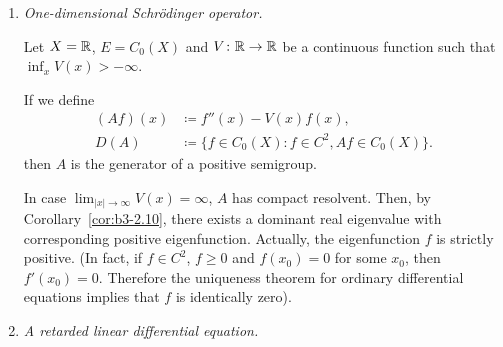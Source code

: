 \begin{example}\label{ex:b3-2.14}
%


\begin{enumerate}[\upshape (i), wide, labelindent=.5em]
	\item \emph{One-dimensional Schrödinger operator.}

	Let $X = \mathbb{R}$, $E = C_{0}(X)$ and $V \colon \mathbb{R} \to \mathbb{R}$ be a continuous function such that $\inf_{x} V(x) > -\infty$.
	
	If we define
	\begin{equation}\label{eq:b3-2.22}
		\begin{aligned}
			(Af)(x) &\coloneqq f''(x) - V(x)f(x), \\
			D(A) &\coloneqq \{f \in C_{0}(X) \colon f \in C^{2}, Af \in C_{0}(X)\}.
		\end{aligned}
	\end{equation}
	then $A$ is the generator of a positive semigroup.
	
	In case $\lim_{|x| \to \infty}V(x) = \infty$, $A$ has compact resolvent.
	Then, by Corollary~\ref{cor:b3-2.10}, there exists a dominant real eigenvalue with corresponding positive eigenfunction.
	Actually, the eigenfunction $f$ is strictly positive. 
    (In fact, if $f \in C^{2}$, $f \geq 0$ and $f(x_{0}) = 0$ for some $x_{0}$, then $f'(x_{0}) = 0$.
	Therefore the uniqueness theorem for ordinary differential equations implies that $f$ is identically zero).
	
\item \emph{A retarded linear differential equation.} 	


\end{enumerate}
\end{example}
